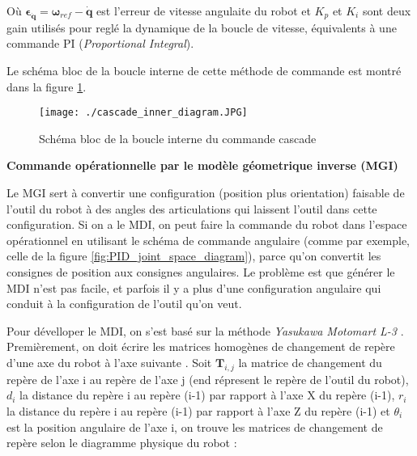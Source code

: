 Où $ \bm{\epsilon_{\dot{q}}} = \bm{\omega}_{ref} - \bm{\dot{q}} $ est l'erreur de vitesse angulaite du robot et $ K_p $ et $ K_i $ sont deux gain utilisés pour reglé la dynamique de la boucle de vitesse, équivalents à une commande PI (\textit{Proportional Integral}).

Le schéma bloc de la boucle interne de cette méthode de commande est montré dans la figure \ref{fig: cascade_inner_diagram}.

\begin{figure}[H]
	\begin{center}	
		\captionsetup{justification=centering,margin=1cm}
		\texttt{[image: ./cascade\_inner\_diagram.JPG]}
		\caption{Schéma bloc de la boucle interne du commande cascade}
		\label{fig: cascade_inner_diagram}
	\end{center}
\end{figure}


\textbf{Commande opérationnelle par le modèle géometrique inverse (MGI)}
\newline

Le MGI sert à convertir une configuration (position plus orientation) faisable de l'outil du robot à des angles des articulations qui laissent l'outil dans cette configuration. Si on a le MDI, on peut faire la commande du robot dans l'espace opérationnel en utilisant le schéma de commande angulaire (comme par exemple, celle de la figure \ref{fig:PID_joint_space_diagram}), parce qu'on convertit les consignes de position aux consignes angulaires. Le problème est que générer le MDI n'est pas facile, et parfois il y a plus d'une configuration angulaire qui conduit à la configuration de l'outil qu'on veut.

Pour dévelloper le MDI, on s'est basé sur la méthode \textit{Yasukawa Motomart L-3} \cite{craig2005introduction}. Premièrement, on doit écrire les matrices homogènes de changement de repère d'une axe du robot à l'axe suivante \cite{khalil2004modeling}. Soit $\bm{T}_{i,j}$ la matrice de changement du repère de l'axe i au repère de l'axe j (end répresent le repère de l'outil du robot), $d_i$ la distance du repère i au repère (i-1) par rapport à l'axe X du repère (i-1), $r_i$ la distance du repère i au repère (i-1) par rapport à l'axe Z du repère (i-1) et $ \theta_i $ est la position angulaire de l'axe i, on trouve les matrices de changement de repère selon le diagramme physique du robot \cite{YoubotKin}:


